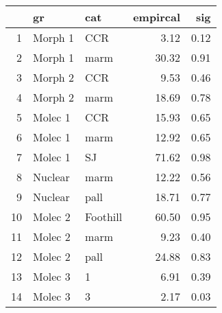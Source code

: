 \begin{table}[ht]
\centering
\begin{tabular}{rllrr}
  \hline
 & gr & cat & empircal & sig \\ 
  \hline
1 & Morph 1 & CCR & 3.12 & 0.12 \\ 
  2 & Morph 1 & marm & 30.32 & 0.91 \\ 
  3 & Morph 2 & CCR & 9.53 & 0.46 \\ 
  4 & Morph 2 & marm & 18.69 & 0.78 \\ 
  5 & Molec 1 & CCR & 15.93 & 0.65 \\ 
  6 & Molec 1 & marm & 12.92 & 0.65 \\ 
  7 & Molec 1 & SJ & 71.62 & 0.98 \\ 
  8 & Nuclear & marm & 12.22 & 0.56 \\ 
  9 & Nuclear & pall & 18.71 & 0.77 \\ 
  10 & Molec 2 & Foothill & 60.50 & 0.95 \\ 
  11 & Molec 2 & marm & 9.23 & 0.40 \\ 
  12 & Molec 2 & pall & 24.88 & 0.83 \\ 
  13 & Molec 3 & 1 & 6.91 & 0.39 \\ 
  14 & Molec 3 & 3 & 2.17 & 0.03 \\ 
   \hline
\end{tabular}
\label{llmiss}
\end{table}
